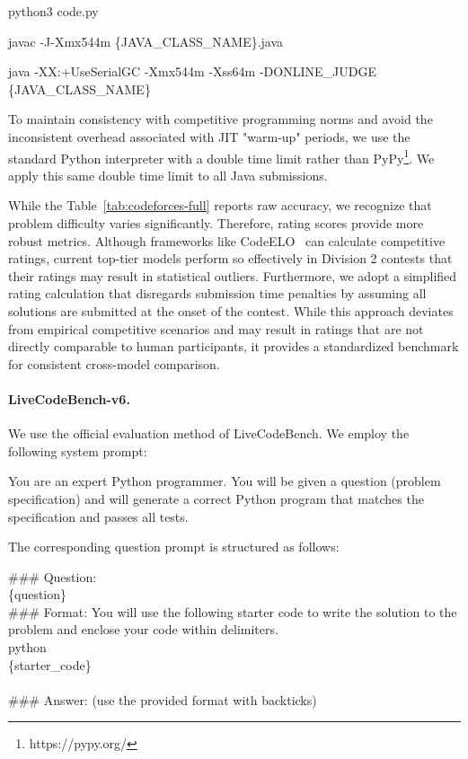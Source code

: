 \begin{MyBox}{}
\small
python3 code.py
\end{MyBox}

\begin{MyBox}{}
\small
javac -J-Xmx544m \{JAVA\_CLASS\_NAME\}.java

java -XX:+UseSerialGC -Xmx544m -Xss64m -DONLINE\_JUDGE \{JAVA\_CLASS\_NAME\}
\end{MyBox}

To maintain consistency with competitive programming norms and avoid the inconsistent overhead associated with JIT "warm-up" periods, we use the standard Python interpreter with a double time limit rather than PyPy\footnote{https://pypy.org/}. We apply this same double time limit to all Java submissions.

While the Table~\ref{tab:codeforces-full} reports raw accuracy, we recognize that problem difficulty varies significantly. Therefore, rating scores provide more robust metrics. Although frameworks like CodeELO~\cite{quan2025codeelobenchmarkingcompetitionlevelcode} can calculate competitive ratings, current top-tier models perform so effectively in Division 2 contests that their ratings may result in statistical outliers. Furthermore, we adopt a simplified rating calculation that disregards submission time penalties by assuming all solutions are submitted at the onset of the contest. While this approach deviates from empirical competitive scenarios and may result in ratings that are not directly comparable to human participants, it provides a standardized benchmark for consistent cross-model comparison.

\paragraph{LiveCodeBench-v6.} We use the official evaluation method of LiveCodeBench\cite{jain2024livecodebench}. We employ the following system prompt:

\begin{MyBox}{}

    You are an expert Python programmer. You will be given a question (problem specification) and will generate a correct Python program that matches the specification and passes all tests.
\end{MyBox}

The corresponding question prompt is structured as follows:

\begin{MyBox}{}

    \#\#\# Question: \\
    \{question\} \\
    \#\#\# Format: You will use the following starter code to write the solution to the problem and enclose your code within delimiters. \\
    \textasciigrave\textasciigrave\textasciigrave{} python \\
    \{starter\_code\} \\
    \textasciigrave\textasciigrave\textasciigrave\\
    \#\#\# Answer: (use the provided format with backticks)
\end{MyBox}


